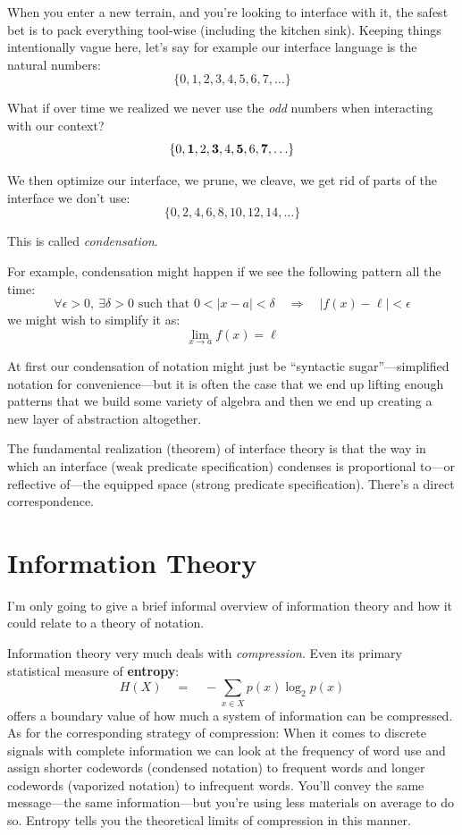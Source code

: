 \documentclass[twoside]{article}
\newcommand{\then}{\ensuremath{\quad\Longrightarrow\quad}}
\begin{document}
When you enter a new terrain, and you're looking to interface with it, the safest bet is to pack everything tool-wise
(including the kitchen sink). Keeping things intentionally vague here, let's say for example our interface language
is the natural numbers:
$$ \{0, 1, 2, 3, 4, 5, 6, 7, \ldots\} $$

What if over time we realized we never use the \emph{odd} numbers when interacting with our context?
$$ \{0, {\bf 1}, 2, {\bf 3}, 4, {\bf 5}, 6, {\bf 7}, \ldots\} $$

We then optimize our interface, we prune, we cleave, we get rid of parts of the interface we don't use:
$$ \{0, 2, 4, 6, 8, 10, 12, 14, \ldots\} $$

This is called \emph{condensation}.

For example, condensation might happen if we see the following pattern all the time:
$$ \forall\epsilon > 0,\ \exists\delta > 0\mbox{ such that } 0 < |x-a| < \delta\then |f(x)-\ell| < \epsilon $$
we might wish to simplify it as:
$$ \lim_{x\to a}f(x)=\ell $$

At first our condensation of notation might just be ``syntactic sugar''---simplified notation for convenience---but it is
often the case that we end up lifting enough patterns that we build some variety of algebra and then we end up creating
a new layer of abstraction altogether.

The fundamental realization (theorem) of interface theory is that the way in which an interface
(weak predicate specification) condenses is proportional to---or reflective of---the equipped space
(strong predicate specification). There's a direct correspondence.

\section*{Information Theory} %

I'm only going to give a brief informal overview of information theory and how it could relate to a theory of notation.

Information theory very much deals with \emph{compression}. Even its primary statistical measure of {\bf entropy}:
$$ H(X)\quad=\quad -\sum_{x\in X}p(x)\log_2 p(x) $$
offers a boundary value of how much a system of information can be compressed. As for the corresponding strategy
of compression: When it comes to discrete signals with complete information we can look at the frequency of word use
and assign shorter codewords (condensed notation) to frequent words and longer codewords (vaporized notation)
to infrequent words. You'll convey the same message---the same information---but you're using less materials
on average to do so. Entropy tells you the theoretical limits of compression in this manner.
\end{document}
